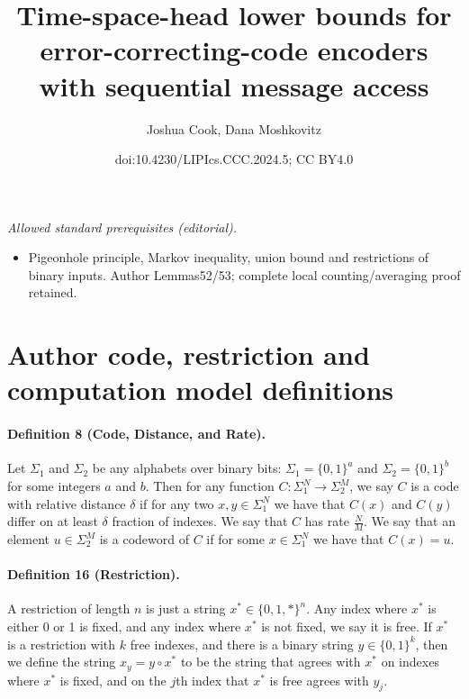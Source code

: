 \documentclass[10pt,a4paper]{article}
\title{Time-space-head lower bounds for error-correcting-code encoders with sequential message access}
\author{Joshua Cook, Dana Moshkovitz}
\date{doi:10.4230/LIPIcs.CCC.2024.5; CC BY4.0}
\begin{document}
\maketitle
\noindent\textit{Allowed standard prerequisites (editorial).}\begin{itemize}
\item Pigeonhole principle, Markov inequality, union bound and restrictions of binary inputs. Author Lemmas52/53; complete local counting/averaging proof retained.
\end{itemize}\medskip
\section*{Author code, restriction and computation model definitions}
\paragraph{Definition 8 (Code, Distance, and Rate).} Let $\Sigma_1$ and $\Sigma_2$ be any alphabets over binary bits: $\Sigma_1=\{0,1\}^a$ and $\Sigma_2=\{0,1\}^b$ for some integers $a$ and $b$. Then for any function $C:\Sigma_1^N\to\Sigma_2^M$, we say $C$ is a code with relative distance $\delta$ if for any two $x,y\in\Sigma_1^N$ we have that $C(x)$ and $C(y)$ differ on at least $\delta$ fraction of indexes.
We say that $C$ has rate $\frac NM$. We say that an element $u\in\Sigma_2^M$ is a codeword of $C$ if for some $x\in\Sigma_1^N$ we have that $C(x)=u$.
\paragraph{Definition 16 (Restriction).} A restriction of length $n$ is just a string $x^*\in\{0,1,*\}^n$. Any index where $x^*$ is either 0 or 1 is fixed, and any index where $x^*$ is not fixed, we say it is free.
If $x^*$ is a restriction with $k$ free indexes, and there is a binary string $y\in\{0,1\}^k$, then we define the string $x_y=y\circ x^*$ to be the string that agrees with $x^*$ on indexes where $x^*$ is fixed, and on the $j$th index that $x^*$ is free agrees with $y_j$.
\end{document}
